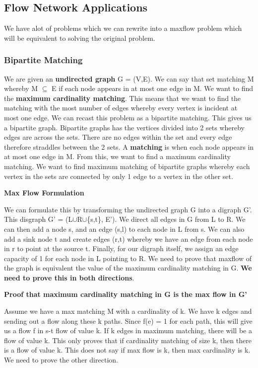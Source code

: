 \documentclass[11pt, oneside]{article}
\theoremstyle{definition}
\begin{document}
\subsection{Flow Network Applications}
We have alot of problems which we can rewrite into a maxflow problem which will be equivalent to solving the original problem.

\subsubsection{Bipartite Matching}
We are given an \textbf{undirected graph} G = (V,E). We can say that set matching M whereby M $\subseteq$ E if each node appears in at most one edge in M. We want to find the \textbf{maximum cardinality matching}. This means that we want to find the matching with the most number of edges whereby every vertex is incident at most one edge. We can recast this problem as a bipartite matching. This gives us a bipartite graph. Bipartite graphs has the vertices divided into 2 sets whereby edges are across the sets. There are no edges within the set and every edge therefore straddles between the 2 sets. A \textbf{matching} is when each node appears in at most one edge in M. From this, we want to find a maximum cardinality matching. We want to find maximum matching of bipartite graphs whereby each vertex in the sets are connected by only 1 edge to a vertex in the other set.

\textbf{Max Flow Formulation}

We can formulate this by transforming the undirected graph G into a digraph G'. This disgraph G' = (L$\cup$R$\cup$\{s,t\}, E').  We direct all edges in G from L to R. We can then add a node s, and an edge (s,l) to each node in L from s. We can also add a sink node t and create edges (r,t) whereby we have an edge from each node in r to point at the source t. Finally, for our digraph itself, we assign an edge capacity of 1 for each node in L pointing to R.
We need to prove that maxflow of the graph is equivalent the value of the maximum cardinality matching in G. \textbf{We need to prove this in both directions}.

\textbf{Proof that maximum cardinality matching in G is the max flow in G'}

Assume we have a max matching M with a cardinality of k. We have k edges and sending out a flow along these k paths. Since f(e) = 1 for each path, this will give us a flow f in s-t flow of value k. If k edges in maximum matching, there will be a flow of value k. This only proves that if cardinality matching of size k, then there is a flow of value k. This does not say if max flow is k, then max cardinality is k. We need to prove the other direction.
\end{document}
